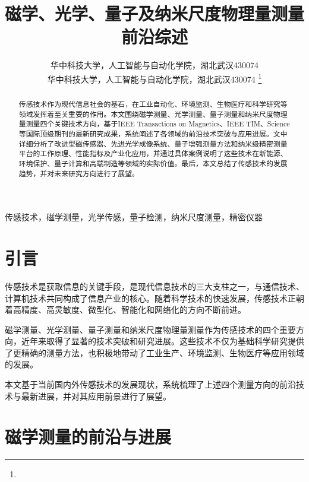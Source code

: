 \documentclass[lettersize,journal]{IEEEtran}
\begin{document}
	\title{磁学、光学、量子及纳米尺度物理量测量前沿综述}
	
	\author{华中科技大学，人工智能与自动化学院，湖北武汉430074\\
		华中科技大学，人工智能与自动化学院，湖北武汉430074
		\thanks{}}
	
	\maketitle
	
	\begin{abstract}
		传感技术作为现代信息社会的基石，在工业自动化、环境监测、生物医疗和科学研究等领域发挥着至关重要的作用。本文围绕磁学测量、光学测量、量子测量和纳米尺度物理量测量四个关键技术方向，基于IEEE Transactions on Magnetics、IEEE TIM、Science等国际顶级期刊的最新研究成果，系统阐述了各领域的前沿技术突破与应用进展。文中详细分析了改进型磁传感器、先进光学成像系统、量子增强测量方法和纳米级精密测量平台的工作原理、性能指标及产业化应用，并通过具体案例说明了这些技术在新能源、环境保护、量子计算和高端制造等领域的实际价值。最后，本文总结了传感技术的发展趋势，并对未来研究方向进行了展望。
	\end{abstract}
	
	\begin{IEEEkeywords}
		传感技术，磁学测量，光学传感，量子检测，纳米尺度测量，精密仪器
	\end{IEEEkeywords}
	
	
	\section{引言}
	\label{sec:introduction}
	传感技术是获取信息的关键手段，是现代信息技术的三大支柱之一，与通信技术、计算机技术共同构成了信息产业的核心。随着科学技术的快速发展，传感技术正朝着高精度、高灵敏度、微型化、智能化和网络化的方向不断前进。
	
	磁学测量、光学测量、量子测量和纳米尺度物理量测量作为传感技术的四个重要方向，近年来取得了显著的技术突破和研究进展。这些技术不仅为基础科学研究提供了更精确的测量方法，也积极地带动了工业生产、环境监测、生物医疗等应用领域的发展。
	
	本文基于当前国内外传感技术的发展现状，系统梳理了上述四个测量方向的前沿技术与最新进展，并对其应用前景进行了展望。
	
	
	\section{磁学测量的前沿与进展}
	\label{sec:magnetic}
	
\end{document}
